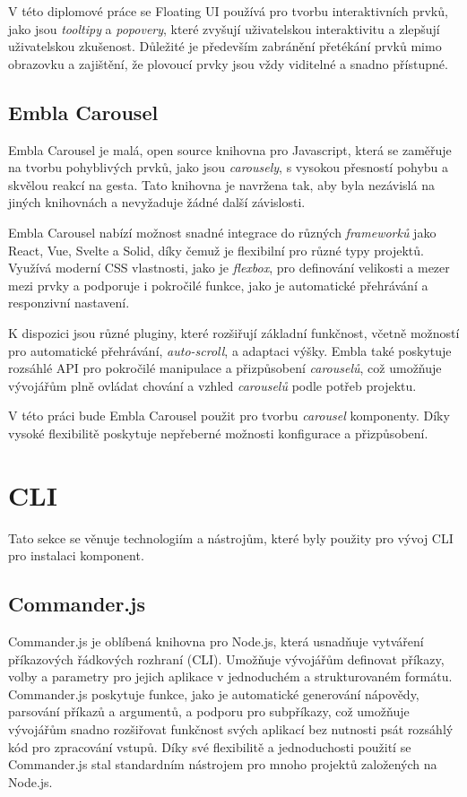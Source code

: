 V této diplomové práce se Floating UI používá pro tvorbu interaktivních prvků, jako jsou \emph{tooltipy} a \emph{popovery}, které zvyšují uživatelskou interaktivitu a zlepšují uživatelskou zkušenost. Důležité je především zabránění přetékání prvků mimo obrazovku a zajištění, že plovoucí prvky jsou vždy viditelné a snadno přístupné.

\subsection{Embla Carousel}
Embla Carousel je malá, open source knihovna pro Javascript, která se zaměřuje na tvorbu pohyblivých prvků, jako jsou \emph{carousely}, s vysokou přesností pohybu a skvělou reakcí na gesta. Tato knihovna je navržena tak, aby byla nezávislá na jiných knihovnách a nevyžaduje žádné další závislosti. \cite{EmblaCarousel}

Embla Carousel nabízí možnost snadné integrace do různých \emph{frameworků} jako React, Vue, Svelte a Solid, díky čemuž je flexibilní pro různé typy projektů. Využívá moderní CSS vlastnosti, jako je \emph{flexbox}, pro definování velikosti a mezer mezi prvky a podporuje i pokročilé funkce, jako je automatické přehrávání a responzivní nastavení.

K dispozici jsou různé pluginy, které rozšiřují základní funkčnost, včetně možností pro automatické přehrávání, \emph{auto-scroll}, a adaptaci výšky. Embla také poskytuje rozsáhlé API pro pokročilé manipulace a přizpůsobení \emph{carouselů}, což umožňuje vývojářům plně ovládat chování a vzhled \emph{carouselů} podle potřeb projektu.

V této práci bude Embla Carousel použit pro tvorbu \emph{carousel} komponenty. Díky vysoké flexibilitě poskytuje nepřeberné možnosti konfigurace a přizpůsobení.

\section{CLI}
Tato sekce se věnuje technologiím a nástrojům, které byly použity pro vývoj CLI pro instalaci komponent.

\subsection{Commander.js}
Commander.js je oblíbená knihovna pro Node.js, která usnadňuje vytváření příkazových řádkových rozhraní (CLI). Umožňuje vývojářům definovat příkazy, volby a parametry pro jejich aplikace v jednoduchém a strukturovaném formátu. Commander.js poskytuje funkce, jako je automatické generování nápovědy, parsování příkazů a argumentů, a podporu pro subpříkazy, což umožňuje vývojářům snadno rozšiřovat funkčnost svých aplikací bez nutnosti psát rozsáhlý kód pro zpracování vstupů. Díky své flexibilitě a jednoduchosti použití se Commander.js stal standardním nástrojem pro mnoho projektů založených na Node.js. \cite{CommanderJS}

